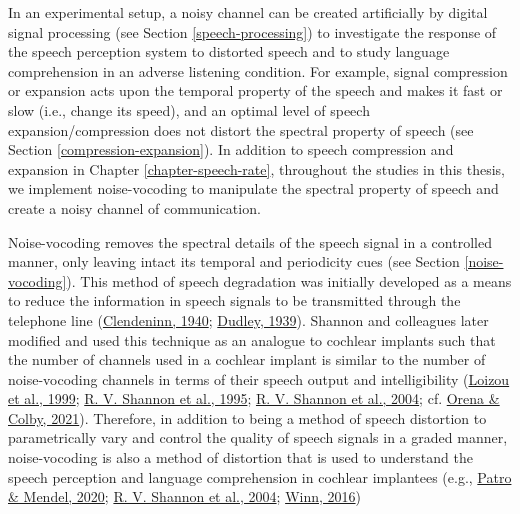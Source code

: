 \documentclass[a4paper, nobind]{templates/ociamthesis}
\begin{document}
In an experimental setup, a noisy channel can be created artificially by digital signal processing (see Section \ref{speech-processing}) to investigate the response of the speech perception system to distorted speech
and to study language comprehension in an adverse listening condition.
For example, signal compression or expansion acts upon the temporal property of the speech and makes it fast or slow (i.e., change its speed), and an optimal level of speech expansion/compression does not distort the spectral property of speech (see Section \ref{compression-expansion}).
In addition to speech compression and expansion in Chapter \ref{chapter-speech-rate},
throughout the studies in this thesis, we implement noise-vocoding to manipulate the spectral property of speech and create a noisy channel of communication.

Noise-vocoding removes the spectral details of the speech signal in a controlled manner, only leaving intact its temporal and periodicity cues (see Section \ref{noise-vocoding}).
This method of speech degradation was initially developed as a means to reduce the information in speech signals to be transmitted through the telephone line (\protect\hyperlink{ref-Vocoder1940}{Clendeninn, 1940}; \protect\hyperlink{ref-Dudley1939}{Dudley, 1939}).
Shannon and colleagues later modified and used this technique as an analogue to cochlear implants such that the number of channels used in a cochlear implant is similar to the number of noise-vocoding channels in terms of their speech output and intelligibility (\protect\hyperlink{ref-Loizou1999}{Loizou et al., 1999}; \protect\hyperlink{ref-Shannon1995}{R. V. Shannon et al., 1995}; \protect\hyperlink{ref-Shannon2004}{R. V. Shannon et al., 2004}; cf. \protect\hyperlink{ref-Orena2021}{Orena \& Colby, 2021}).
Therefore, in addition to being a method of speech distortion to parametrically vary and control the quality of speech signals in a graded manner,
noise-vocoding is also a method of distortion that is used to understand the speech perception and language comprehension in cochlear implantees (e.g., \protect\hyperlink{ref-Patro2020}{Patro \& Mendel, 2020}; \protect\hyperlink{ref-Shannon2004}{R. V. Shannon et al., 2004}; \protect\hyperlink{ref-Winn2016}{Winn, 2016})
\end{document}
